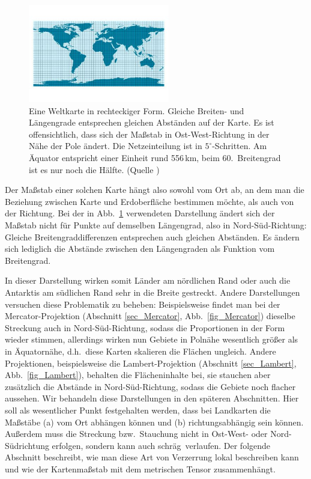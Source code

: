 \begin{figure}
\includegraphics[trim= 0cm 1.0cm 0.3cm 1.0cm,clip,width=0.55\textwidth]{./Bilder/Zylinderprojektion.jpg}
\caption{\label{fig_Zylinder}%
Eine Weltkarte in rechteckiger Form. Gleiche Breiten- und
L\"angengrade entsprechen gleichen Abst\"anden auf der Karte. Es ist offensichtlich, dass sich
der Ma\ss stab in Ost-West-Richtung in der N\"ahe der Pole \"andert. Die Netzeinteilung ist
in $5^\circ$-Schritten. Am \"Aquator entspricht einer Einheit rund 556\,km, beim $60$.\ Breitengrad
ist es nur noch die H\"alfte. (Quelle \cite{WikiNetz})}  
\end{figure}
 
Der Ma\ss stab einer solchen Karte h\"angt also sowohl vom Ort ab, an dem man 
die Beziehung zwischen Karte und Erdoberfl\"ache bestimmen m\"ochte, als auch von der
Richtung. Bei der in Abb.\ \ref{fig_Zylinder} verwendeten Darstellung \"andert sich der
Ma\ss stab nicht f\"ur Punkte auf demselben L\"angengrad, also in Nord-S\"ud-Richtung: 
Gleiche Breitengraddifferenzen entsprechen auch
gleichen Abst\"anden. Es \"andern sich lediglich die Abst\"ande zwischen den L\"angengraden 
als Funktion vom Breitengrad.  

In dieser Darstellung wirken somit L\"ander am n\"ordlichen Rand oder auch
die Antarktis am s\"udlichen Rand sehr in die Breite gestreckt. Andere Darstellungen versuchen
diese Problematik zu beheben: Beispielsweise findet man bei der 
Mercator-Projektion (Abschnitt \ref{sec_Mercator}, Abb.\ \ref{fig_Mercator}) 
dieselbe Streckung auch in Nord-S\"ud-Richtung, sodass die Proportionen in der Form wieder stimmen,
allerdings wirken nun Gebiete in Poln\"ahe wesentlich gr\"o\ss er als in \"Aquatorn\"ahe, d.h.\ diese
Karten skalieren die Fl\"achen ungleich. Andere Projektionen, beispielsweise die 
Lambert-Projektion (Abschnitt \ref{sec_Lambert}, Abb.\ \ref{fig_Lambert}),
behalten die Fl\"acheninhalte bei, sie stauchen aber zus\"atzlich die Abst\"ande  in Nord-S\"ud-Richtung,
sodass die Gebiete noch flacher aussehen. Wir behandeln diese Darstellungen in den
sp\"ateren Abschnitten. Hier soll als wesentlicher Punkt festgehalten werden, dass bei Landkarten
die Ma\ss st\"abe (a) vom Ort abh\"angen k\"onnen und (b) richtungsabh\"angig sein k\"onnen. 
Au\ss erdem muss die Streckung bzw.\ Stauchung nicht in Ost-West- oder Nord-S\"udrichtung erfolgen,
sondern kann auch \glqq schr\"ag\grqq\ verlaufen. Der folgende Abschnitt beschreibt, wie man
diese Art von Verzerrung lokal beschreiben kann und wie der Kartenma\ss stab mit dem metrischen
Tensor zusammenh\"angt. 

